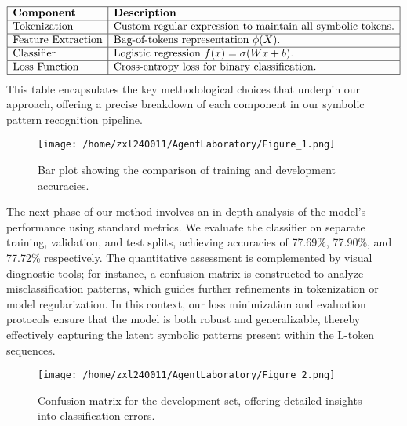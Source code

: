 \documentclass{article}
\begin{document}
\[
\begin{array}{|l|l|}
\hline
\textbf{Component} & \textbf{Description} \\ \hline
\text{Tokenization} & \text{Custom regular expression to maintain all symbolic tokens.} \\ \hline
\text{Feature Extraction} & \text{Bag-of-tokens representation \(\phi(X)\).} \\ \hline
\text{Classifier} & \text{Logistic regression \(f(x)=\sigma(Wx+b)\).} \\ \hline
\text{Loss Function} & \text{Cross-entropy loss for binary classification.} \\ \hline
\end{array}
\]
This table encapsulates the key methodological choices that underpin our approach, offering a precise breakdown of each component in our symbolic pattern recognition pipeline.

\begin{figure}[h]
\caption{Bar plot showing the comparison of training and development accuracies.}
\centering
\texttt{[image: /home/zxl240011/AgentLaboratory/Figure\_1.png]}
\label{fig:fig1}
\end{figure}

The next phase of our method involves an in-depth analysis of the model’s performance using standard metrics. We evaluate the classifier on separate training, validation, and test splits, achieving accuracies of 77.69\%, 77.90\%, and 77.72\% respectively. The quantitative assessment is complemented by visual diagnostic tools; for instance, a confusion matrix is constructed to analyze misclassification patterns, which guides further refinements in tokenization or model regularization. In this context, our loss minimization and evaluation protocols ensure that the model is both robust and generalizable, thereby effectively capturing the latent symbolic patterns present within the L-token sequences.

\begin{figure}[h]
\caption{Confusion matrix for the development set, offering detailed insights into classification errors.}
\centering
\texttt{[image: /home/zxl240011/AgentLaboratory/Figure\_2.png]}
\label{fig:fig2}
\end{figure}
\end{document}
